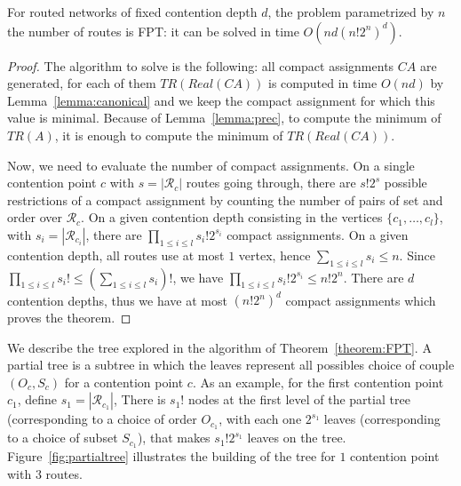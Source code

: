 \begin{theorem}\label{theorem:FPT}
For routed networks of fixed contention depth $d$, the problem \spall parametrized by $n$ the number of routes is FPT: it can be solved in time $O(nd(n!2^{n})^{d})$.
\end{theorem}
\begin{proof}
The algorithm to solve \spall is the following: all compact assignments $CA$ are generated, for each of them $TR(Real(CA))$ is computed in time
$O(nd)$ by Lemma~\ref{lemma:canonical} and we keep the compact assignment for which this value is minimal.  Because of Lemma~\ref{lemma:prec}, to compute the minimum of $TR(A)$, it is enough 
to compute the minimum of $TR(Real(CA))$.

 Now, we need to evaluate the number of compact assignments. 
On a single contention point $c$ with $s = |\mathcal{R}_c|$ routes going through, there are $s!2^s$ possible restrictions of a compact assignment by counting the number of pairs of set and order over $\mathcal{R}_c$.
On a given contention depth consisting in the vertices $\{c_1,\dots,c_l\}$, with $s_i = |\mathcal{R}_{c_{i}}|$, there are 
$\prod_{1 \leq i\leq l} s_i!2^{s_i}$ compact assignments. On a given contention depth, all routes use at most $1$ vertex, hence $\sum_{1 \leq i\leq l} s_i \leq n$. Since $\prod_{1 \leq i\leq l} s_i! \leq (\sum_{1 \leq i\leq l} s_i)!$, we have $\prod_{1 \leq i\leq l} s_i!2^{s_i} \leq n!2^n$. There are $d$ contention depths, thus we have at most $ (n!2^{n})^{d}$ compact assignments which proves the theorem.
\end{proof}

We describe the tree explored in the algorithm of Theorem~\ref{theorem:FPT}. A partial tree is a subtree in which the leaves represent all possibles choice of couple $(O_{c},S_c)$ for a contention point $c$. As an example, for the first contention point $c_1$, define $s_1 = |\mathcal{R}_{c_1}|$, There is $s_1!$ nodes at the first level of the partial tree (corresponding to a choice of order $O_{c_1}$, with each one $2^{s_1}$ leaves (corresponding to a choice of subset $S_{c_1}$), that makes $s_1!2^{s_1}$ leaves on the tree. Figure~\ref{fig:partialtree} illustrates the building of the tree for $1$ contention point with $3$ routes.

